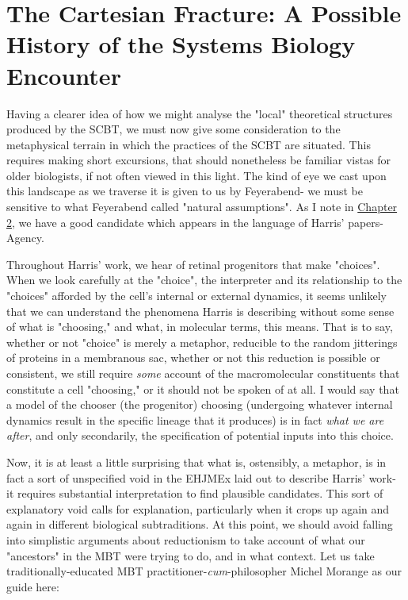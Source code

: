 
\section{The Cartesian Fracture: A Possible History of the Systems Biology Encounter}

Having a clearer idea of how we might analyse the "local" theoretical structures produced by the SCBT, we must now give some consideration to the metaphysical terrain in which the practices of the SCBT are situated. This requires making short excursions, that should nonetheless be familiar vistas for older biologists, if not often viewed in this light. The kind of eye we cast upon this landscape as we traverse it is given to us by Feyerabend- we must be sensitive to what Feyerabend called "natural assumptions". As I note in \hyperref[Ch2]{Chapter 2}, we have a good candidate which appears in the language of Harris' papers- Agency.

Throughout Harris' work, we hear of retinal progenitors that make "choices". When we look carefully at the "choice", the interpreter and its relationship to the "choices" afforded by the cell's internal or external dynamics, it seems unlikely that we can understand the phenomena Harris is describing without some sense of what is "choosing," and what, in molecular terms, this means. That is to say, whether or not "choice" is merely a metaphor, reducible to the random jitterings of proteins in a membranous sac, whether or not this reduction is possible or consistent, we still require \textit{some} account of the macromolecular constituents that constitute a cell "choosing," or it should not be spoken of at all. I would say that a model of the chooser (the progenitor) choosing (undergoing whatever internal dynamics result in the specific lineage that it produces) is in fact \textit{what we are after}, and only secondarily, the specification of potential inputs into this choice.

Now, it is at least a little surprising that what is, ostensibly, a metaphor, is in fact a sort of unspecified void in the EHJMEx laid out to describe Harris' work- it requires substantial interpretation to find plausible candidates. This sort of explanatory void calls for explanation, particularly when it crops up again and again in different biological subtraditions. At this point, we should avoid falling into simplistic arguments about reductionism to take account of what our "ancestors" in the MBT were trying to do, and in what context. Let us take traditionally-educated MBT practitioner-\textit{cum}-philosopher Michel Morange as our guide here:

